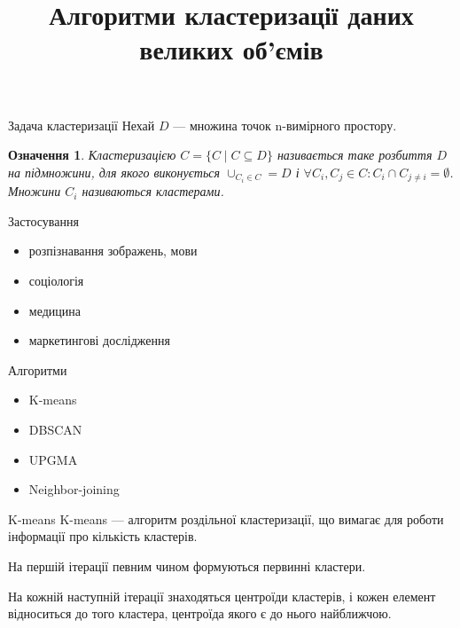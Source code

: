 \documentclass{beamer}
\title{Алгоритми кластеризації даних великих об’ємів}
\date{}
\newtheorem{defn}{Означення}
\begin{document}
    \begin{frame}
        \maketitle
    \end{frame}

    \begin{frame}{Задача кластеризації}
        Нехай $D$ --- множина точок n-вимірного простору. 
        \begin{defn}
            \emph{Кластеризацією} $C = \{C \mid C \subseteq D\}$ називається таке розбиття $D$ на підмножини, 
            для якого виконується $\cup_{C_i \in C} = D$ і $\forall C_i, C_j \in C : C_i \cap C_{j \neq i} = \emptyset$. 
            Множини $C_i$ називаються кластерами.
        \end{defn}
    \end{frame}
    
    
    \begin{frame}{Застосування}
        \begin{itemize}
            \item розпізнавання зображень, мови
            \item соціологія
            \item медицина
            \item маркетингові дослідження
        \end{itemize}
    \end{frame}
    
    \begin{frame}{Алгоритми}
        \begin{itemize}
            \item K-means
            \item DBSCAN
            \item UPGMA
            \item Neighbor-joining
        \end{itemize}
    \end{frame}
    
    \begin{frame}{K-means}
        K-means --- алгоритм роздільної кластеризації, що вимагає для роботи інформації про кількість кластерів.
        
        На першій ітерації певним чином формуються первинні кластери.
        
        На кожній наступній ітерації знаходяться центроїди кластерів, і кожен елемент відноситься до того кластера, центроїда якого є до нього найближчою.       
    \end{frame}
    
\end{document}
